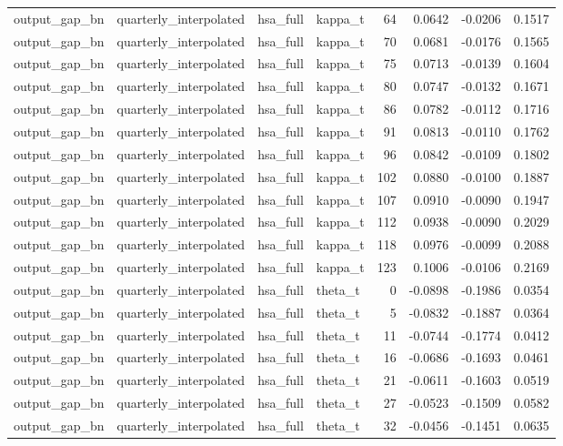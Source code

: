 \begin{tabular}{llllrrrr}
output\_gap\_bn & quarterly\_interpolated & hsa\_full & kappa\_t & 64 & 0.0642 & -0.0206 & 0.1517 \\
output\_gap\_bn & quarterly\_interpolated & hsa\_full & kappa\_t & 70 & 0.0681 & -0.0176 & 0.1565 \\
output\_gap\_bn & quarterly\_interpolated & hsa\_full & kappa\_t & 75 & 0.0713 & -0.0139 & 0.1604 \\
output\_gap\_bn & quarterly\_interpolated & hsa\_full & kappa\_t & 80 & 0.0747 & -0.0132 & 0.1671 \\
output\_gap\_bn & quarterly\_interpolated & hsa\_full & kappa\_t & 86 & 0.0782 & -0.0112 & 0.1716 \\
output\_gap\_bn & quarterly\_interpolated & hsa\_full & kappa\_t & 91 & 0.0813 & -0.0110 & 0.1762 \\
output\_gap\_bn & quarterly\_interpolated & hsa\_full & kappa\_t & 96 & 0.0842 & -0.0109 & 0.1802 \\
output\_gap\_bn & quarterly\_interpolated & hsa\_full & kappa\_t & 102 & 0.0880 & -0.0100 & 0.1887 \\
output\_gap\_bn & quarterly\_interpolated & hsa\_full & kappa\_t & 107 & 0.0910 & -0.0090 & 0.1947 \\
output\_gap\_bn & quarterly\_interpolated & hsa\_full & kappa\_t & 112 & 0.0938 & -0.0090 & 0.2029 \\
output\_gap\_bn & quarterly\_interpolated & hsa\_full & kappa\_t & 118 & 0.0976 & -0.0099 & 0.2088 \\
output\_gap\_bn & quarterly\_interpolated & hsa\_full & kappa\_t & 123 & 0.1006 & -0.0106 & 0.2169 \\
output\_gap\_bn & quarterly\_interpolated & hsa\_full & theta\_t & 0 & -0.0898 & -0.1986 & 0.0354 \\
output\_gap\_bn & quarterly\_interpolated & hsa\_full & theta\_t & 5 & -0.0832 & -0.1887 & 0.0364 \\
output\_gap\_bn & quarterly\_interpolated & hsa\_full & theta\_t & 11 & -0.0744 & -0.1774 & 0.0412 \\
output\_gap\_bn & quarterly\_interpolated & hsa\_full & theta\_t & 16 & -0.0686 & -0.1693 & 0.0461 \\
output\_gap\_bn & quarterly\_interpolated & hsa\_full & theta\_t & 21 & -0.0611 & -0.1603 & 0.0519 \\
output\_gap\_bn & quarterly\_interpolated & hsa\_full & theta\_t & 27 & -0.0523 & -0.1509 & 0.0582 \\
output\_gap\_bn & quarterly\_interpolated & hsa\_full & theta\_t & 32 & -0.0456 & -0.1451 & 0.0635 \\

\end{tabular}
